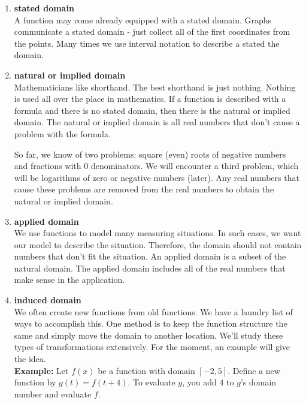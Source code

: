 \documentclass{ximera}
\begin{document}
\begin{enumerate}
\item  \textbf{\textcolor{green!50!black}{stated domain}}   \\
A function may come already equipped with a stated domain.  Graphs communicate a stated domain - just collect all of the first coordinates from the points. Many times we use interval notation to describe a stated the domain.


\item  \textbf{\textcolor{green!50!black}{natural or implied domain}}   \\
Mathematicians like shorthand. The best shorthand is just nothing.  Nothing is used all over the place in mathematics. If a function is described with a formula and there is no stated domain, then there is the natural or implied domain.  The natural or implied domain is all real numbers that don't cause a problem with the formula.

So far, we know of two problems: square (even) roots of negative numbers and fractions with $0$ denominators.  We will encounter a third problem, which will be logarithms of zero or negative numbers (later). Any real numbers that cause these problems are removed from the real numbers to obtain the natural or implied domain.


\item  \textbf{\textcolor{green!50!black}{applied domain}}   \\
We use functions to model many measuring situations. In such cases, we want our model to describe the situation.  Therefore, the domain should not contain numbers that don't fit the situation. An applied domain is a subset of the natural domain.  The applied domain includes all of the real numbers that make sense in the application.


\item \textbf{\textcolor{green!50!black}{induced domain}}  \\
We often create new functions from old functions. We have a laundry list of ways to accomplish this.  One method is to keep the function structure the same and simply move the domain to another location. We'll study these types of transformations extensively. For the moment, an example will give the idea. \\







\textbf{Example:}  Let $f(x)$ be a function with domain $[-2, 5]$.  Define a new function by $g(t) = f(t+4)$.  To evaluate $g$, you add $4$ to $g$'s domain number and evaluate $f$.  


\end{enumerate}
\end{document}
